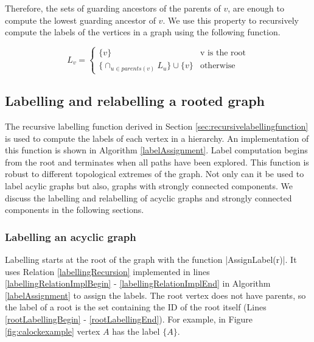 Therefore, the sets of guarding ancestors of the parents of $v$, are enough to compute the lowest guarding ancestor of $v$. 
We use this property to recursively compute the labels of the vertices in a graph using the following function.

\begin{equation}\label{labellingRecursion}
	L_v = 
	\begin{cases}
		\{v\} & \text{v is the root} \\
		\{ \cap_{u\in parents(v)} L_u\} \cup \{v\} & \text{otherwise}
	\end{cases}
\end{equation}


\subsection{Labelling and relabelling a rooted graph}






The recursive labelling function derived in Section \ref{sec:recursivelabellingfunction} is used to compute the labels of each vertex in a hierarchy. An implementation of this function is shown in Algorithm \ref{labelAssignment}. Label computation begins from the root and terminates when all paths have been explored. This function is robust to different topological extremes of the graph. Not only can it be used to label acylic graphs but also, graphs with strongly connected components. We discuss the labelling and relabelling of acyclic graphs and strongly connected components in the following sections. 

\subsubsection{Labelling an acyclic graph}
Labelling starts at the root of the graph with the function \inline|AssignLabel(r)|. It uses Relation \ref{labellingRecursion} implemented in lines \ref{labellingRelationImplBegin} - \ref{labellingRelationImplEnd} in Algorithm \ref{labelAssignment} to assign the labels. The root vertex does not have parents, so the label of a root is the set containing the ID of the root itself (Lines \ref{rootLabellingBegin} - \ref{rootLabellingEnd}). For example, in Figure \ref{fig:calockexample} vertex $A$ has the label $\{A\}$.


